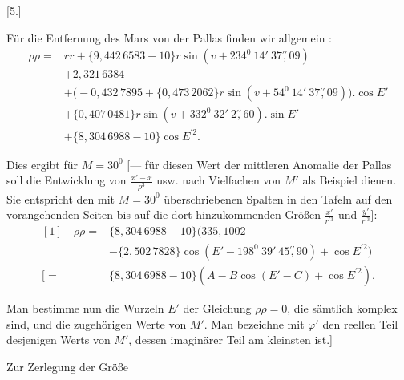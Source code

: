 \clearpage
\begingroup
{}
\renewcommand{\headrulewidth}{0pt}
\par\medskip
{}
\begin{center}[5.]\end{center}
\begingroup
\small
\par\noindent\hspace*{\parindent}Für die Entfernung des Mars von der Pallas finden wir allgemein%
\HistoricalNoteEight{Die Zahlen in den Klammern \(\{\ \}\) sind Logarithmen.]}:
\[
\begin{aligned}
\rho\rho={}&rr+\{9{,}442\,6583-10\}r\sin(v+234^0\ 14'\ 37\overset{\prime\prime}{,}09)\\
&+2{,}321\,6384\\
&+\bigl(-0{,}432\,7895+\{0{,}473\,2062\}r\sin(v+54^0\ 14'\ 37\overset{\prime\prime}{,}09)\bigr)
  \mathord{.}\cos E'\\
&+\{0{,}407\,0481\}r\sin(v+332^0\ 32'\ 2\overset{\prime\prime}{,}60)
  \mathord{.}\sin E'\\
&+\{8{,}304\,6988-10\}\cos E^{\prime2}.
\end{aligned}
\]
\par\noindent\hspace*{\parindent}Dies ergibt für \(M=30^0\) [--- für diesen Wert der mittleren Anomalie der
Pallas soll die Entwicklung von \(\frac{x'-x}{\rho^3}\) usw. nach Vielfachen von \(M'\) als
Beispiel dienen. Sie entspricht den mit \(M=30^0\) überschriebenen Spalten
in den Tafeln auf den vorangehenden Seiten bis auf die dort hinzukommenden Größen
\(\frac{x'}{r^{\prime3}}\) und \(\frac{y'}{r^{\prime3}}\)]:
\[
\begin{aligned}
{[1]}\quad\rho\rho={}&\{8{,}304\,6988-10\}\bigl(335{,}1002\\
&-\{2{,}502\,7828\}\cos(E'-198^0\ 39'\ 45\overset{\prime\prime}{,}90)+\cos E^{\prime2}\bigr)\\
{[}={}&\{8{,}304\,6988-10\}(A-B\cos(E'-C)+\cos E^{\prime2}).
\end{aligned}
\]
\par\noindent\hspace*{\parindent}Man bestimme nun die Wurzeln \(E'\) der Gleichung \(\rho\rho=0\), die
sämtlich komplex sind, und die zugehörigen Werte von \(M'\). Man bezeichne
mit \(\varphi'\) den reellen Teil desjenigen Werts von \(M'\), dessen imaginärer Teil am kleinsten ist.]
\par\noindent\hspace*{\parindent}Zur Zerlegung der Größe
